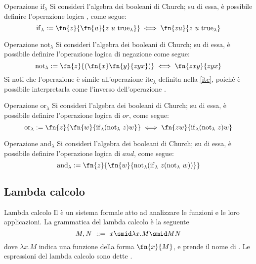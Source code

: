 \documentclass[a4paper, 12pt]{report}
\begin{document}
    \begin{framedprop}{Operazione $\mathrm{if}_\lambda$}
        Si consideri l'algebra dei booleani di Church; su di essa, è possibile definire l'operazione logica , come segue: $$\mathrm{if}_\lambda := \fn{z}{\fn{u}{z \ u \ \mathrm{true}_\lambda}} \iff \fn{zu}{z \ u \ \mathrm{true}_\lambda}$$
    \end{framedprop}

    \begin{framedprop}{Operazione $\mathrm{not}_\lambda$}
        Si consideri l'algebra dei booleani di Church; su di essa, è possibile definire l'operazione logica di negazione come segue: $$\mathrm{not}_\lambda := \fn{z}{(\fn{x}\fn{y}{zyx})} \iff \fn{zxy}{zyx}$$ Si noti che l'operazione è simile all'operazione $\mathrm{ite}_\lambda$ definita nella \cref{ite}, poiché è possibile interpretarla come l'inverso dell'operazione .
    \end{framedprop}

    \begin{framedprop}{Operazione $\mathrm{or}_\lambda$}
        Si consideri l'algebra dei booleani di Church; su di essa, è possibile definire l'operazione logica di $or$, come segue: $$\mathrm{or}_\lambda := \fn{z}{\fn{w}{\mathrm{if}_\lambda(\mathrm{not}_\lambda \ z)w}} \iff \fn{zw}{\mathrm{if}_\lambda(\mathrm{not}_\lambda \ z)w}$$
    \end{framedprop}

    \begin{framedprop}{Operazione $\mathrm{and}_\lambda$}
        Si consideri l'algebra dei booleani di Church; su di essa, è possibile definire l'operazione logica di $and$, come segue: $$\mathrm{and}_\lambda := \fn{z}{\fn{w}{\mathrm{not}_\lambda(\mathrm{if}_\lambda \ z (\mathrm{not}_\lambda \ w))}}$$
    \end{framedprop}

    \subsection{Lambda calcolo}

    \begin{frameddefn}{Lambda calcolo}
        Il  è un sistema formale atto ad analizzare le funzioni e le loro applicazioni. La grammatica del lambda calcolo è la seguente $$M,N \ ::= \ x \smid \lambda x . M \smid MN$$ dove $\lambda x.M$ indica una funzione della forma $\fn{x}{M}$, e prende il nome di . Le espressioni del lambda calcolo sono dette .
    \end{frameddefn}
\end{document}
